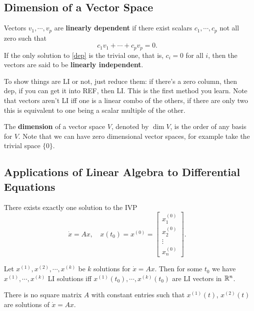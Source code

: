 \subsection{Dimension of a Vector Space}
\begin{definition}
    Vectors $v_1,\cdots ,v_p$ are \textbf{linearly dependent} if there exist scalars $c_1,\cdots ,c_p$ not all zero such that 
    \begin{equation}\label{dep}
    c_1v_1+\cdots +c_pv_p=0.
\end{equation}If the only solution to \cref{dep} is the trivial one, that is, $c_i =0$ for all $i$, then the vectors are said to be \textbf{linearly independent}.
\end{definition}
To show things are LI or not, just reduce them: if there's a zero column, then dep, if you can get it into REF, then LI. This is the first method you learn. Note that vectors aren't LI iff one is a linear combo of the others, if there are only two this is equivalent to one being a scalar multiple of the other.
\begin{definition}[Dimension]
    The \textbf{dimension} of a vector space $V$, denoted by $\operatorname{dim}V$, is the order of any basis for $V$. Note that we can have zero dimensional vector spaces, for example take the trivial space $\{0\} $.
\end{definition}

\subsection{Applications of Linear Algebra to Differential Equations}
\begin{theorem}
   There exists exactly one solution to the IVP \[
       \dot x=Ax,\quad x(t_0)=x^{(0)}=
       \begin{bmatrix}
           x_1^{(0)}\\
           x_2^{(0)}\\
           \vdots\\
           x_n ^{(0)}
       \end{bmatrix}.
   \]  
\end{theorem}
\begin{theorem}\label{lisol}
    Let $x^{(1)},x^{(2)},\cdots ,x^{(k)}$ be $k$ solutions for $\dot x=Ax$. Then for some $t_0$ we have $x^{(1)},\cdots ,x^{(k)}$ LI solutions iff $x^{(1)}(t_0),\cdots ,x^{(k)}(t_0)$ are LI vectors in $\mathbb{R}^n $.
\end{theorem}
\begin{remark}
    There is no square matrix $A$ with constant entries such that $x^{(1)}(t)$, $x^{(2)}(t)$ are solutions of $\dot x=Ax$.
\end{remark}

